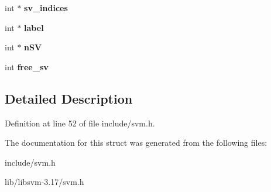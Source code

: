 \begin{DoxyCompactItemize}
\item 
\hypertarget{structsvm__model_a884d1c72b138f1fa444295ec6c98aa60}{
int $\ast$ {\bfseries sv\_\-indices}}
\label{structsvm__model_a884d1c72b138f1fa444295ec6c98aa60}

\item 
\hypertarget{structsvm__model_aa99202683a615ac663377c52bb776a1e}{
int $\ast$ {\bfseries label}}
\label{structsvm__model_aa99202683a615ac663377c52bb776a1e}

\item 
\hypertarget{structsvm__model_a03f8b6777e7b758bcd9f8849231f6068}{
int $\ast$ {\bfseries nSV}}
\label{structsvm__model_a03f8b6777e7b758bcd9f8849231f6068}

\item 
\hypertarget{structsvm__model_a2ae57ce1fa43497d151aff26c21a13a1}{
int {\bfseries free\_\-sv}}
\label{structsvm__model_a2ae57ce1fa43497d151aff26c21a13a1}

\end{DoxyCompactItemize}


\subsection{Detailed Description}


Definition at line 52 of file include/svm.h.



The documentation for this struct was generated from the following files:\begin{DoxyCompactItemize}
\item 
include/svm.h\item 
lib/libsvm-\/3.17/svm.h\end{DoxyCompactItemize}

